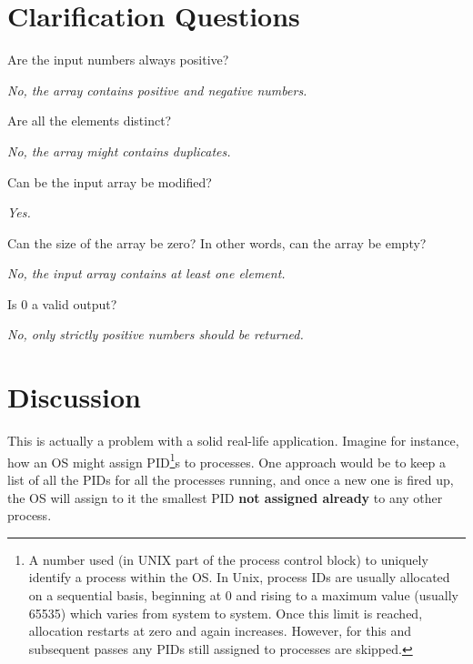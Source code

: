\section{Clarification Questions}

\begin{QandA}
	\item Are the input numbers always positive?
	\begin{answered}
		\textit{No, the array contains positive and negative numbers.}
	\end{answered}

	\item Are all the elements distinct?
	\begin{answered}
		\textit{No, the array might contains duplicates.}
	\end{answered}
	
	\item Can be the input array be modified?
	\begin{answered}
		\textit{Yes.}
	\end{answered}

	\item Can the size of the array be zero? In other words, can the array be empty?
	\begin{answered}
		\textit{No, the input array contains at least one element.}
	\end{answered}

	\item Is $0$ a valid output?
	\begin{answered}
		\textit{No, only strictly positive numbers should be returned.}
	\end{answered}

\end{QandA}

\section{Discussion}
\label{first_positive_missing:sec:discussion}
This is actually a problem with a solid real-life application.
Imagine for instance, how an OS might assign PID\footnote{A number used (in UNIX part of the process control block) to uniquely identify a process within the OS. In Unix, process IDs are usually allocated on a sequential basis, beginning at 0 and rising to a maximum value (usually 65535) which varies from system to system. Once this limit is reached, allocation restarts at zero and again increases. However, for this and subsequent passes any PIDs still assigned to processes are skipped.}s to processes. One approach would be to keep a list of all the PIDs for all the processes running, and once a new one is fired up, the OS will assign to it the smallest PID \textbf{not assigned already} to any other process. 

